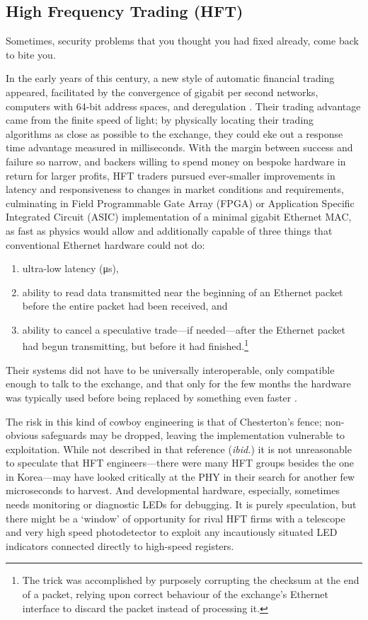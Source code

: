 \documentclass[conference]{IEEEtran}
\begin{document}
\subsection{High Frequency Trading (HFT)}\label{section:HFT}

Sometimes, security problems that you thought you had fixed already, come
back to bite you.

In the early years of this century, a new style of automatic financial
trading appeared, facilitated by the convergence of gigabit per second
networks, computers with 64-bit address spaces, and deregulation
\cite{Lewis2014a}. Their trading advantage came from the finite speed of
light; by physically locating their trading algorithms as close as possible
to the exchange, they could eke out a response time advantage measured in
milliseconds. With the margin between success and failure so narrow, and
backers willing to spend money on bespoke hardware in return for larger
profits, HFT traders pursued ever-smaller improvements in latency and
responsiveness to changes in market conditions and requirements, culminating
in Field Programmable Gate Array (FPGA) or Application Specific
Integrated Circuit (ASIC) implementation of a minimal gigabit Ethernet MAC,
as fast as physics would allow and additionally capable of three things that
conventional Ethernet hardware could not do:

\begin{enumerate}
    \item ultra-low latency (\si{\micro\second}),
    \item ability to read data transmitted near the beginning of an Ethernet
        packet before the entire packet had been received, and
    \item ability to cancel a speculative trade---if needed---after the
        Ethernet packet had begun transmitting, but before it had
        finished.\footnote{The trick was accomplished by purposely corrupting
        the checksum at the end of a packet, relying upon correct behaviour
        of the exchange's Ethernet interface to discard the packet instead of
        processing it.}
\end{enumerate}

Their systems did not have to be universally interoperable, only compatible
enough to talk to the exchange, and that only for the few months the hardware
was typically used before being replaced by something even faster
\cite{Hurd2018a}.

The risk in this kind of cowboy engineering is that of Chesterton's fence;
non-obvious safeguards may be dropped, leaving the implementation vulnerable
to exploitation. While not described in that reference ({\it ibid.}) it is not
unreasonable to speculate that HFT engineers---there were many HFT groups
besides the one in Korea---may have looked critically at the PHY in their
search for another few microseconds to harvest. And developmental hardware,
especially, sometimes needs monitoring or diagnostic LEDs for debugging. It
is purely speculation, but there might be a `window' of opportunity for rival
HFT firms with a telescope and very high speed photodetector to exploit any
incautiously situated LED indicators connected directly to high-speed
registers.
\end{document}
